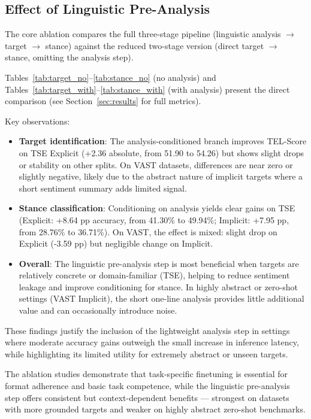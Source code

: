 \documentclass[conference]{IEEEtran}
\begin{document}
\subsection{Effect of Linguistic Pre-Analysis}

The core ablation compares the full three-stage pipeline (linguistic analysis $\to$ target $\to$ stance) against the reduced two-stage version (direct target $\to$ stance, omitting the analysis step).

Tables~\ref{tab:target_no}--\ref{tab:stance_no} (no analysis) and Tables~\ref{tab:target_with}--\ref{tab:stance_with} (with analysis) present the direct comparison (see Section~\ref{sec:results} for full metrics).

Key observations:
\begin{itemize}
    \item \textbf{Target identification}: The analysis-conditioned branch improves TEL-Score on TSE Explicit (+2.36 absolute, from 51.90 to 54.26) but shows slight drops or stability on other splits. On VAST datasets, differences are near zero or slightly negative, likely due to the abstract nature of implicit targets where a short sentiment summary adds limited signal.
    \item \textbf{Stance classification}: Conditioning on analysis yields clear gains on TSE (Explicit: +8.64 pp accuracy, from 41.30\% to 49.94\%; Implicit: +7.95 pp, from 28.76\% to 36.71\%). On VAST, the effect is mixed: slight drop on Explicit (-3.59 pp) but negligible change on Implicit.
    \item \textbf{Overall}: The linguistic pre-analysis step is most beneficial when targets are relatively concrete or domain-familiar (TSE), helping to reduce sentiment leakage and improve conditioning for stance. In highly abstract or zero-shot settings (VAST Implicit), the short one-line analysis provides little additional value and can occasionally introduce noise.
\end{itemize}

These findings justify the inclusion of the lightweight analysis step in settings where moderate accuracy gains outweigh the small increase in inference latency, while highlighting its limited utility for extremely abstract or unseen targets.

The ablation studies demonstrate that task-specific finetuning is essential for format adherence and basic task competence, while the linguistic pre-analysis step offers consistent but context-dependent benefits — strongest on datasets with more grounded targets and weaker on highly abstract zero-shot benchmarks.
\end{document}
